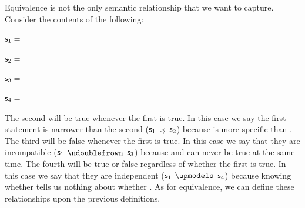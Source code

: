 	Equivalence is not the only semantic relationship that we want to capture. Consider the contents of the following:
	\begin{description}
		\item $\mathsf{s}_1=$
		\item $\mathsf{s}_2=$
		\item $\mathsf{s}_3=$
		\item $\mathsf{s}_4=$
	\end{description}
	The second will be true whenever the first is true. In this case we say the first statement is narrower than the second ($\mathsf{s}_1$ $\preccurlyeq$ $\mathsf{s}_2$) because  is more specific than . The third will be false whenever the first is true. In this case we say that they are incompatible ($\mathsf{s}_1$ $\ncomp$ $\mathsf{s}_3$) because  and  can never be true at the same time. The fourth will be true or false regardless of whether the first is true. In this case we say that they are independent ($\mathsf{s}_1$ $\indep$ $\mathsf{s}_4$) because knowing whether  tells us nothing about whether . As for equivalence, we can define these relationships upon the previous definitions.
	
